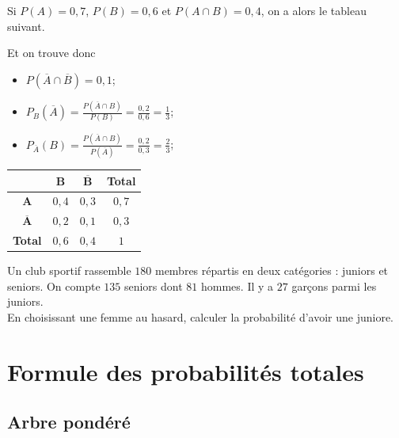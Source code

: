 \documentclass[11pt]{article}
\begin{document}
\begin{exemple}
  Si $P(A)=0,7$, $P(B)=0,6$ et $P(A\cap B)=0,4$, on a alors le tableau
  suivant.\\
  \begin{minipage}[]{.5\textwidth}
 Et on trouve donc
\begin{itemize}
  \item $P(\overline A\cap\overline B)=0,1$;
  \item $P_B(\overline A)=\frac{P(\overline A\cap
    B)}{P(B)}=\frac{0,2}{0,6}=\frac{1}{3}$;
  \item $P_{\overline A}(B)=\frac{P(\overline A\cap
    B)}{P(\overline A)}=\frac{0,2}{0,3}=\frac{2}{3}$;
\end{itemize}
  \end{minipage}
  \begin{minipage}[]{.5\textwidth}
 \begin{center}
\renewcommand{\arraystretch}{1.5}
\begin{tabular}{cccc}
  \toprule
  & $\mathbf{B}$ & $\mathbf{\overline B}$ & \textbf{Total} \\ \midrule
  $\mathbf{A}$ & $0,4$ & $0,3$ & $0,7$ \\
  $\mathbf{\overline A}$ & $0,2$ & $0,1$ & $0,3$ \\
  \textbf{Total} & $0,6$ & $0,4$ & $1$ \\ \bottomrule
\end{tabular}
\end{center}
  \end{minipage}
\end{exemple}

\begin{app}
  Un club sportif rassemble $180$ membres répartis en deux catégories : juniors
  et seniors. On compte $135$ seniors dont $81$ hommes. Il y a $27$ garçons
  parmi les juniors.\\
  En choisissant une femme au hasard, calculer la probabilité d'avoir une
  juniore.
\end{app}

\section{Formule des probabilités totales}
\subsection{Arbre pondéré}
\end{document}
